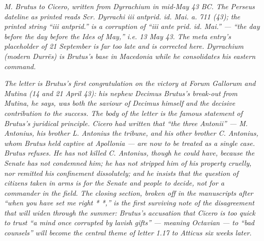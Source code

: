 
\textit{M. Brutus to Cicero, written from Dyrrachium in
mid-May 43 BC. The Perseus dateline as printed reads
\textit{Scr. Dyrrachi iii antprid. id. Mai. a. 711 (43)};
the printed string ``iii antprid.'' is a corruption of
``\textit{iii ante prid. id. Mai.}'' --- ``the day before
the day before the Ides of May,'' i.e. 13 May 43.
The meta entry's placeholder of 21 September is far
too late and is corrected here. Dyrrachium (modern
Durrës) is Brutus's base in Macedonia while he
consolidates his eastern command.}

\textit{The letter is Brutus's first congratulation on
the victory at Forum Gallorum and Mutina (14 and 21 April
43): his nephew Decimus Brutus's break-out from Mutina,
he says, was both the saviour of Decimus himself and the
decisive contribution to the success. The body of the
letter is the famous statement of Brutus's juridical
principle. Cicero had written that ``the three Antonii''
--- M. Antonius, his brother L. Antonius the tribune, and
his other brother C. Antonius, whom Brutus held captive
at Apollonia --- are now to be treated as a single case.
Brutus refuses. He has not killed C. Antonius, though he
could have, because the Senate has not condemned him; he
has not stripped him of his property cruelly, nor remitted
his confinement dissolutely; and he insists that the
question of citizens taken in arms is for the Senate and
people to decide, not for a commander in the field. The
closing section, broken off in the manuscripts after
``when you have set me right * *,'' is the first surviving
note of the disagreement that will widen through the
summer: Brutus's accusation that Cicero is too quick to
trust ``a mind once corrupted by lavish gifts'' --- meaning
Octavian --- to ``bad counsels'' will become the central
theme of letter 1.17 to Atticus six weeks later.}
